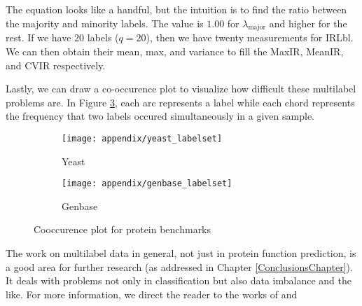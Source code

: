 \par The equation looks like a handful, but the intuition is to find the ratio
between the majority and minority labels. The value is $1.00$ for
$\lambda_{\text{major}}$ and higher for the rest. If we have $20$ labels
($q=20$), then we have twenty measurements for IRLbl. We can then obtain their
mean, max, and variance to fill the MaxIR, MeanIR, and CVIR respectively.

\par Lastly, we can draw a co-occurence plot to visualize how difficult these
multilabel problems are. In Figure \ref{appendix:cooccurence}, each arc
represents a label while each chord represents the frequency that two labels
occured simultaneously in a given sample.

\begin{figure}[!h]
  \centering
  \begin{subfigure}[b]{0.48\textwidth}
    \texttt{[image: appendix/yeast\_labelset]}
    \caption{Yeast}
    \label{cooccurence:yeast}
  \end{subfigure}
  \begin{subfigure}[b]{0.48\textwidth}
    \texttt{[image: appendix/genbase\_labelset]}
    \caption{Genbase}
    \label{cooccurence:genbase}
  \end{subfigure}
  \caption{Cooccurence plot for protein benchmarks}
  \label{appendix:cooccurence}
\end{figure}

\par The work on multilabel data in general, not just in protein function
prediction, is a good area for further research (as addressed in Chapter
\ref{ConclusionsChapter}). It deals with problems not only in classification
but also  data imbalance and the like. For more information, we direct the
reader to the works of \cite{charte2015imbalance, charte2015mlsmote} and \cite{
charte2017dealing}
